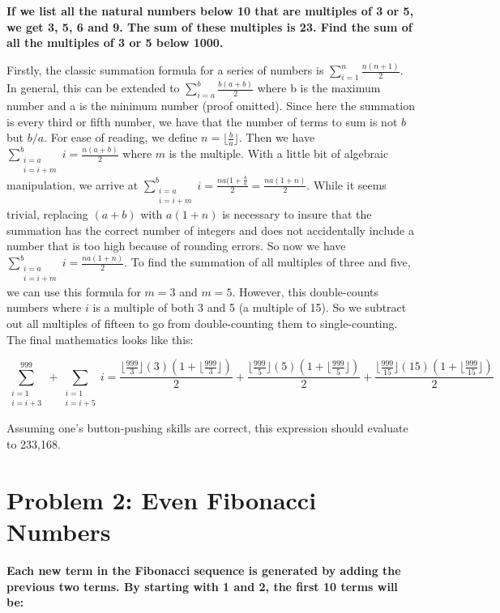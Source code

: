 \documentclass{article}
\begin{document}
\textbf{If we list all the natural numbers below 10 that are multiples of 3 or 5, we get 3, 
5, 6 and 9. The sum of these multiples is 23. Find the sum of all the multiples of 3 or 5 
below 1000.}

Firstly, the classic summation formula for a series of numbers is 
$\sum\limits_{i=1}^{n}\frac{n(n+1)}{2}$. In general, this can be extended to 
$\sum\limits_{i=a}^{b}\frac{b(a+b)}{2}$ where b is the maximum number and a is the minimum 
number (proof omitted). Since here the summation is every third or fifth number, we have that 
the number of terms to sum is not $b$ but $b/a$. For ease of reading, we define 
$n = \lfloor\frac{b}{a}\rfloor$. Then we have 
$\sum\limits_{\substack{i=a \\ i=i+m}}^{b}i=\frac{n(a+b)}{2}$ where $m$ is the multiple. With 
a little bit of algebraic manipulation, we arrive at
$\sum\limits_{\substack{i=a \\ i=i+m}}^{b}i=\frac{na(1+\frac{b}{a}}{2}=\frac{na(1+n)}{2}$.
While it seems trivial, replacing $(a + b)$ with $a(1 + n)$ is necessary to insure that the 
summation has the correct number of integers and does not accidentally include a number that 
is too high because of rounding errors. So now we have
$\sum\limits_{\substack{i=a \\ i=i+m}}^{b}i=\frac{na(1+n)}{2}$. To find the summation of all 
multiples of three and five, we can use this formula for $m = 3$ and $m = 5$. However, this 
double-counts numbers where $i$ is a multiple of both 3 and 5 (a multiple of 15). So we 
subtract out all multiples of fifteen to go from double-counting them to single-counting. The
final mathematics looks like this:

\[
\sum\limits_{\substack{i=1 \\ i=i+3}}^{999} + \sum\limits_{\substack{i=1 \\ i=i+5}} i = 
\frac{\lfloor\frac{999}{3}\rfloor(3)(1+\lfloor\frac{999}{3}\rfloor)}{2} + 
\frac{\lfloor\frac{999}{5}\rfloor(5)(1+\lfloor\frac{999}{5}\rfloor)}{2} + 
\frac{\lfloor\frac{999}{15}\rfloor(15)(1+\lfloor\frac{999}{15}\rfloor)}{2}
\]

Assuming one’s button-pushing skills are correct, this expression should evaluate to 233,168.

\section{Problem 2: Even Fibonacci Numbers}

\textbf{Each new term in the Fibonacci sequence is generated by adding the previous two 
terms. By starting with 1 and 2, the first 10 terms will be:}
\end{document}
